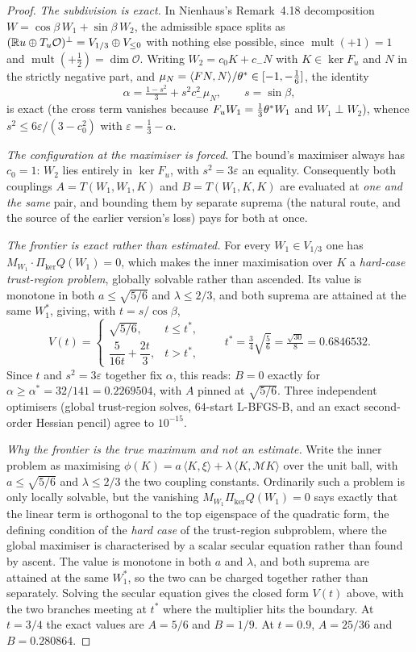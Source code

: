 \begin{proof}
\emph{The subdivision is exact.} In Nienhaus's Remark~4.18 decomposition $W=\cos\beta\,W_1+\sin\beta\,W_2$, the admissible space splits as $(\mathbb{R} u\oplus T_u\mathcal O)^\perp=V_{1/3}\oplus V_{\le0}$ with nothing else possible, since $\operatorname{mult}(+1)=1$ and $\operatorname{mult}(+\tfrac12)=\dim\mathcal O$. Writing $W_2=c_0K+c_-N$ with $K\in\ker F_u$ and $N$ in the strictly negative part, and $\mu_N=\langle F N,N\rangle/\theta^{*}\in[-1,-\tfrac16]$, the identity
\[
\alpha=\tfrac{1-s^2}{3}+s^2c_-^2\mu_N,\qquad s=\sin\beta,
\]
is exact (the cross term vanishes because $F_uW_1=\tfrac13\theta^{*} W_1$ and $W_1\perp W_2$), whence $s^2\le6\varepsilon/(3-c_0^2)$ with $\varepsilon=\tfrac13-\alpha$.

\emph{The configuration at the maximiser is forced.} The bound's maximiser always has $c_0=1$: $W_2$ lies entirely in $\ker F_u$, with $s^2=3\varepsilon$ an equality. Consequently both couplings $A=T(W_1,W_1,K)$ and $B=T(W_1,K,K)$ are evaluated at \emph{one and the same} pair, and bounding them by separate suprema (the natural route, and the source of the earlier version's loss) pays for both at once.

\emph{The frontier is exact rather than estimated.} For every $W_1\in V_{1/3}$ one has $M_{W_1}\cdot\Pi_{\ker}Q(W_1)=0$, which makes the inner maximisation over $K$ a \emph{hard-case trust-region problem}, globally solvable rather than ascended. Its value is monotone in both $a\le\sqrt{5/6}$ and $\lambda\le2/3$, and both suprema are attained at the same $W_1^{*}$, giving, with $t=s/\cos\beta$,
\[
V(t)=\begin{cases}\sqrt{5/6}, & t\le t^{*},\\[3pt]
\dfrac{5}{16t}+\dfrac{2t}{3}, & t>t^{*},\end{cases}
\qquad t^{*}=\tfrac34\sqrt{\tfrac56}=\tfrac{\sqrt{30}}8=0.6846532 .
\]
Since $t$ and $s^2=3\varepsilon$ together fix $\alpha$, this reads: $B=0$ exactly for $\alpha\ge\alpha^{*}=32/141=0.2269504$, with $A$ pinned at $\sqrt{5/6}$. Three independent optimisers (global trust-region solves, $64$-start L-BFGS-B, and an exact second-order Hessian pencil) agree to $10^{-15}$.

\emph{Why the frontier is the true maximum and not an estimate.} Write the inner problem as maximising $\phi(K)=a\,\langle K,\xi\rangle+\lambda\,\langle K,\mathcal M K\rangle$ over the unit ball, with $a\le\sqrt{5/6}$ and $\lambda\le2/3$ the two coupling constants. Ordinarily such a problem is only locally solvable, but the vanishing $M_{W_1}\Pi_{\ker}Q(W_1)=0$ says exactly that the linear term is orthogonal to the top eigenspace of the quadratic form, the defining condition of the \emph{hard case} of the trust-region subproblem, where the global maximiser is characterised by a scalar secular equation rather than found by ascent. The value is monotone in both $a$ and $\lambda$, and both suprema are attained at the same $W_1^{*}$, so the two can be charged together rather than separately. Solving the secular equation gives the closed form $V(t)$ above, with the two branches meeting at $t^{*}$ where the multiplier hits the boundary. At $t=3/4$ the exact values are $A=5/6$ and $B=1/9$. At $t=0.9$, $A=25/36$ and $B=0.280864$.


\end{proof}
